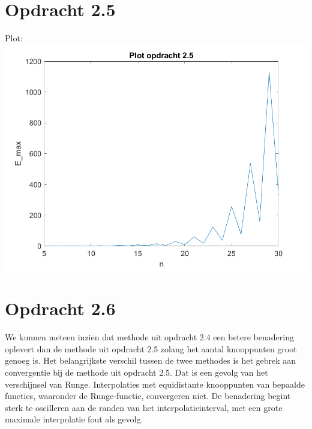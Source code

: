 \documentclass[a4paper]{article}
\begin{document}
\section*{Opdracht 2.5}
Plot:
\\{}
\includegraphics[scale = 0.8]{plot2_5}
%
%
%
%
%
%
\section*{Opdracht 2.6}
We kunnen meteen inzien dat methode uit opdracht 2.4 een betere benadering oplevert dan de  methode uit opdracht 2.5 zolang het aantal knooppunten groot genoeg is. Het belangrijkste verschil tussen de twee methodes is het gebrek aan convergentie bij de methode uit opdracht 2.5. Dat is een gevolg van het verschijnsel van Runge. Interpolaties met equidistante knooppunten van bepaalde functies, waaronder de Runge-functie, convergeren niet. De benadering begint sterk te oscilleren aan de randen van het interpolatieinterval, met een grote maximale interpolatie fout als gevolg.
\end{document}
